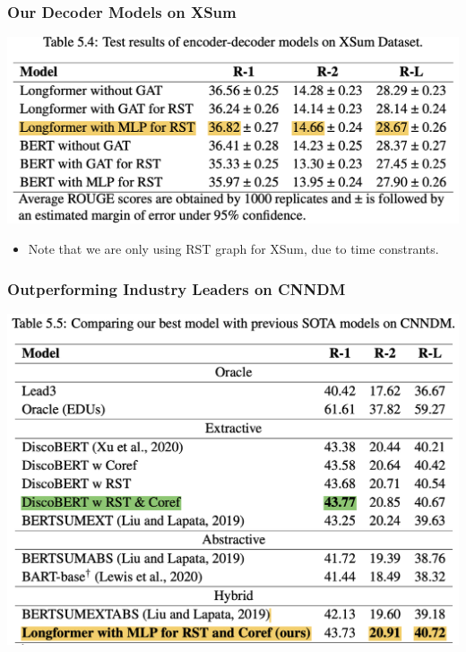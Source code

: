 \documentclass{beamer}
\begin{document}
\begin{frame}
\frametitle{Our Decoder Models on XSum}

   \begin{minipage}[t][0.5\textheight][t]{\textwidth}
      \centering
      \includegraphics[width=\textwidth]{imgs/table54_highlight.png} 
  \end{minipage}

  \vfill

  \begin{minipage}[t][0.3\textheight][t]{\textwidth}
    \begin{itemize}
      \item Note that we are only using RST graph for XSum, due to time constrants.
    \end{itemize}
  \end{minipage}
 
\end{frame}


\begin{frame}
\frametitle{Outperforming Industry Leaders on CNNDM}

   \begin{minipage}[t][0.5\textheight][t]{\textwidth}
      \centering
      \includegraphics[scale=0.36]{imgs/table55_highlight.png} 
  \end{minipage}
 
\end{frame}
\end{document}
